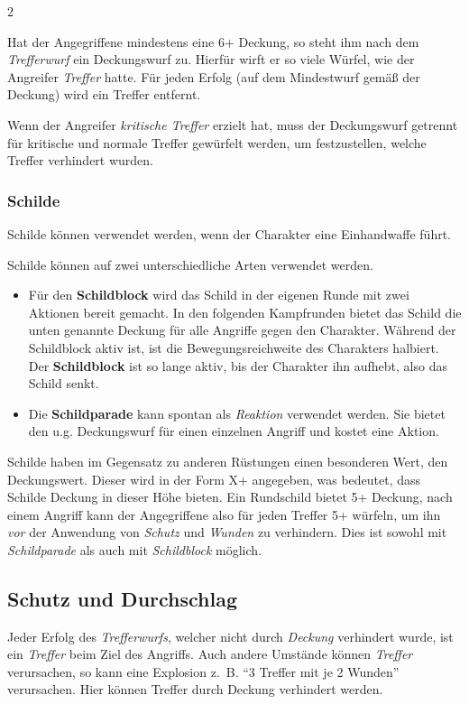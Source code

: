 \begin{multicols}{2}
\begin{pexample}[Beispiel]
Hat der Angegriffene mindestens eine 6+ Deckung, so steht ihm nach dem \textit{Trefferwurf} ein Deckungswurf zu. Hierfür wirft er so viele Würfel, wie der Angreifer \textit{Treffer} hatte. Für jeden Erfolg (auf dem Mindestwurf gemäß der Deckung) wird ein Treffer entfernt.

Wenn der Angreifer \textit{kritische Treffer} erzielt hat, muss der Deckungswurf getrennt für kritische und normale Treffer gewürfelt werden, um festzustellen, welche Treffer verhindert wurden.

\subsubsection{Schilde}

Schilde können verwendet werden, wenn der Charakter eine Einhandwaffe führt.

Schilde können auf zwei unterschiedliche Arten verwendet werden.
\begin{itemize}
    \item Für den \textbf{Schildblock} wird das Schild in der eigenen Runde mit zwei Aktionen bereit gemacht. In den folgenden Kampfrunden bietet das Schild die unten genannte Deckung für alle Angriffe gegen den Charakter. Während der Schildblock aktiv ist, ist die Bewegungsreichweite des Charakters halbiert. Der \textbf{Schildblock} ist so lange aktiv, bis der Charakter ihn aufhebt, also das Schild senkt.
    \item Die \textbf{Schildparade} kann spontan als \textit{Reaktion} verwendet werden. Sie bietet den u.g. Deckungswurf für einen einzelnen Angriff und kostet eine Aktion.
\end{itemize}

Schilde haben im Gegensatz zu anderen Rüstungen einen besonderen Wert, den Deckungswert. Dieser wird in der Form X+ angegeben, was bedeutet, dass Schilde Deckung in dieser Höhe bieten. Ein Rundschild bietet 5+ Deckung, nach einem Angriff kann der Angegriffene also für jeden Treffer 5+ würfeln, um ihn \textit{vor} der Anwendung von \textit{Schutz} und \textit{Wunden} zu verhindern. Dies ist sowohl mit \textit{Schildparade} als auch mit \textit{Schildblock} möglich.

\subsection{Schutz und Durchschlag}

Jeder Erfolg des \textit{Trefferwurfs}, welcher nicht durch \textit{Deckung} verhindert wurde, ist ein \textit{Treffer} beim Ziel des Angriffs. Auch andere Umstände können \textit{Treffer} verursachen, so kann eine Explosion z.~B. ``3 Treffer mit je 2 Wunden'' verursachen. Hier können Treffer durch Deckung verhindert werden.


\end{pexample}
\end{multicols}
